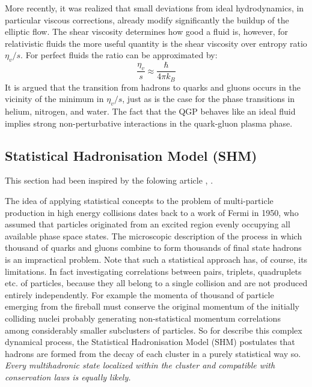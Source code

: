 \documentclass[12pt,a4paper]{book}
\begin{document}
	More recently, it was realized that small deviations from ideal hydrodynamics, in particular viscous corrections, already modify significantly the buildup of the elliptic flow. The shear viscosity determines how good a fluid is, however, for relativistic
	fluids the more useful quantity is the shear viscosity over entropy ratio $\eta_v/s$. For perfect	fluids the ratio can be approximated by:
	\begin{equation}
		\frac{\eta_v}{s} \approx \frac{\hbar}{4\pi k_B}
	\end{equation}
	It is argued that the transition from hadrons to quarks and gluons	occurs in the vicinity of the minimum in $\eta_v/s$, just as is the case for the phase transitions	in helium, nitrogen, and water. The fact that the QGP behaves like an ideal fluid implies strong non-perturbative interactions in the quark-gluon plasma phase.
	
	
	\subsection{Statistical Hadronisation Model (SHM)}
	This section had been inspired by the folowing article \cite{becattini2009introductionstatisticalhadronizationmodel}, \cite{charm_hierarchy_in_the_statistical_hadronization_model} \cite{heinz2004conceptsheavyionphysics} \cite{amsdottorato9036}.
	
	The idea of applying statistical concepts to the problem of multi-particle production in high energy collisions dates back to a work of Fermi in 1950, who assumed that particles originated from an excited region evenly occupying all available phase space states. The microscopic description of the process in which thousand of quarks and gluons combine to form	thousands of final state hadrons is an impractical problem. Note that such a statistical approach has, of course, its limitations. In fact investigating correlations between pairs, triplets, quadruplets etc. of particles, because they all belong to a single collision and are not produced entirely independently. For example the momenta of thousand of particle emerging from the fireball must conserve the original momentum of the initially colliding nuclei probably generating non-statistical momentum correlations among considerably smaller subclusters of particles. So for describe this complex dynamical process, the Statistical Hadronisation Model (SHM) postulates that hadrons are formed from the decay of each cluster in a purely statistical way so. \textit{Every multihadronic state localized within the cluster and compatible with conservation laws is equally likely.}
	
\end{document}
